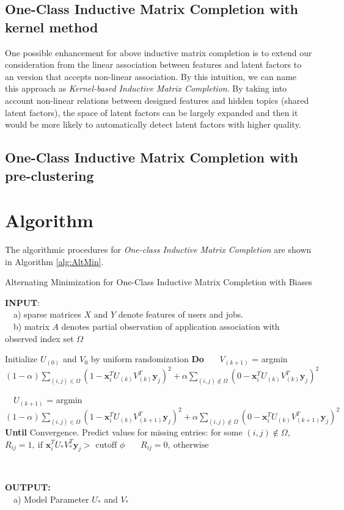 \documentclass{article} %
\begin{document}
\subsection{One-Class Inductive Matrix Completion with kernel method}
One possible enhancement for above inductive matrix completion is to
extend our consideration from the linear association between features and
latent factors to an version that accepts non-linear association.
By this intuition, we can name this approach as 
    {\it Kernel-based Inductive Matrix Completion}.
By taking into account non-linear relations between designed features and hidden
topics (shared latent factors), the space of latent factors can be largely
expanded and then it would be more likely to automatically detect latent
factors with higher quality. 
 
\subsection{One-Class Inductive Matrix Completion with pre-clustering}

\section{Algorithm}
\newcommand{\xii}{\boldsymbol{x}_i}
\newcommand{\yj}{\boldsymbol{y}_j}
The algorithmic procedures for {\it One-class Inductive Matrix Completion} are
shown in Algorithm \ref{alg:AltMin}.  
\begin{algorithm}
    \caption{Alternating Minimization for 
        One-Class Inductive Matrix Completion with Biases}
    \label{alg:AltMin}
    \begin{algorithmic}[1]

\State \textbf{INPUT}: \\ \ \ a) sparse matrices $X$ and $Y$ denote features of users
and jobs. \\ \ \ b) matrix $A$ denotes partial observation of application
association with observed index set $\Omega$
\State \

\State Initialize $U_{(0)}$ and $V_{0}$ by uniform randomization
\State \textbf{Do}  
\State \ \ \
$V_{(k+1)}$ = argmin $(1-\alpha) \sum_{(i,j) \in \Omega} 
    (1- \xii^T U_{(k)} V_{(k)}^T \yj)^2 
    + \alpha \sum_{(i,j) \not \in \Omega} (0 - \xii^T U_{(k)} V_{(k)}^T \yj)^2$

\State \  \
$U_{(k+1)}$ = argmin $(1-\alpha) \sum_{(i,j) \in \Omega}
    (1-\xii^T U_{(k)} V_{(k+1)}^T \yj)^2 +
    \alpha \sum_{(i,j) \not \in \Omega}
    (0-\xii^T U_{(k)} V_{(k+1)}^T \yj)^2$
\State \textbf{Until} Convergence. 
\State Predict values for missing entries: for some $ (i,j) \not \in \Omega$,
\State 
\ \  \ $R_{ij} = 1,\ \text{if } \xii^T U_{*} V_{*}^T \yj > \text{ cutoff } \phi$
\State 
\ \  \ $R_{ij} = 0,\ \text{otherwise}$

\State \

\State \textbf{OUTPUT: } \\ 
\ \ a) Model Parameter $ U_{*}$ and $V_{*}$ 
\end{algorithmic}
\end{algorithm}
\end{document}
